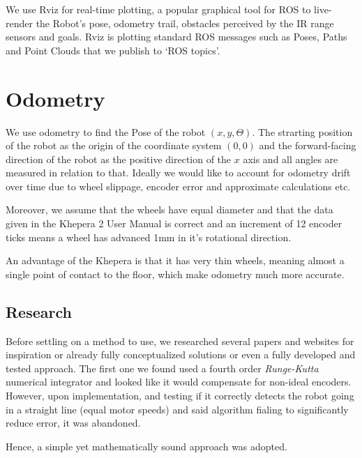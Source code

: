 \documentclass[11pt, a4paper]{article}
\begin{document}
We use Rviz for real-time plotting, a popular graphical tool for ROS to live-render the 
Robot's pose, odometry trail, obstacles perceived by the IR range sensors and goals. 
Rviz is plotting standard ROS messages such as Poses, Paths and Point Clouds that we publish 
to `ROS topics'.



\newpage
\section{Odometry}
\label{Odometry}


We use odometry to find the Pose of the robot ${(x,y,\Theta)}$. The strarting position of the robot as the origin of the coordinate system ${(0, 0)}$
and the forward-facing direction of the robot as the positive direction of the $x$ axis and
all angles are measured in relation to that. Ideally we would like to account for odometry drift
over time due to wheel slippage, encoder error and approximate calculations etc.

Moreover, we assume that the wheels have equal diameter and that the data given in the 
Khepera 2 User Manual \cite{khepera_manual} is correct and an increment of 12 encoder ticks 
means a wheel has advanced 1mm in it's rotational direction.

An advantage of the Khepera is that it has very thin wheels, meaning almost a single point of contact
to the floor, which make odometry much more accurate.

\subsection{Research}

Before settling on a method to use, we researched several papers and websites for inspiration or 
already fully conceptualized solutions or even a fully developed and tested approach. The first one
we found used a fourth order \textit{Runge-Kutta} numerical integrator \cite{runge_kutta} and looked like 
it would compensate for non-ideal encoders. However, upon implementation, and  testing if it correctly 
detects the robot going in a straight line (equal motor speeds) and said algorithm fialing to significantly reduce error, it was abandoned. 

Hence, a simple yet mathematically sound approach \cite{odo_used} was adopted. 
\end{document}
